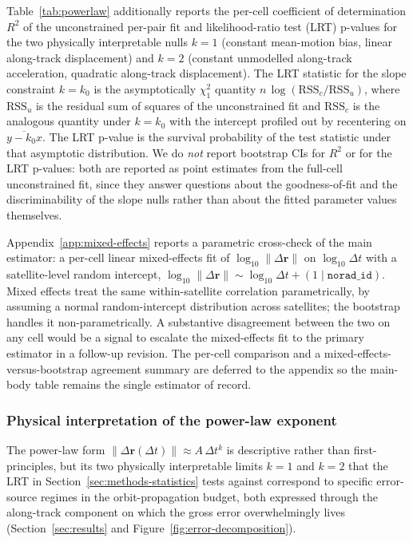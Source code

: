 \documentclass[10pt, letterpaper]{article}
\begin{document}
Table~\ref{tab:powerlaw} additionally reports the per-cell
coefficient of determination $R^{2}$ of the unconstrained
per-pair fit and likelihood-ratio test (LRT) p-values for the two
physically interpretable nulls $k = 1$ (constant mean-motion bias,
linear along-track displacement) and $k = 2$ (constant unmodelled
along-track acceleration, quadratic along-track displacement). The
LRT statistic for the slope constraint $k = k_{0}$ is the
asymptotically $\chi^{2}_{1}$ quantity
$n\,\log(\mathrm{RSS}_{c} / \mathrm{RSS}_{u})$, where
$\mathrm{RSS}_{u}$ is the residual sum of squares of the
unconstrained fit and $\mathrm{RSS}_{c}$ is the analogous quantity
under $k = k_{0}$ with the intercept profiled out by recentering on
$\overline{y - k_{0} x}$. The LRT p-value is the survival probability
of the test statistic under that asymptotic distribution. We do
\emph{not} report bootstrap CIs for $R^{2}$ or for the LRT
p-values: both are reported as point estimates from the full-cell
unconstrained fit, since they answer questions about the
goodness-of-fit and the discriminability of the slope nulls rather
than about the fitted parameter values themselves.

Appendix~\ref{app:mixed-effects} reports a parametric cross-check
of the main estimator: a per-cell linear mixed-effects fit of
$\log_{10}\lVert\Delta\mathbf{r}\rVert$ on $\log_{10}\Delta t$
with a satellite-level random intercept,
$\log_{10}\lVert\Delta\mathbf{r}\rVert \sim
\log_{10}\Delta t + (1 \mid \texttt{norad\_id})$.
Mixed effects treat the same within-satellite correlation
parametrically, by assuming a normal random-intercept distribution
across satellites; the bootstrap handles it non-parametrically. A
substantive disagreement between the two on any cell would be a
signal to escalate the mixed-effects fit to the primary estimator
in a follow-up revision. The per-cell comparison and a
mixed-effects-versus-bootstrap agreement summary are deferred to
the appendix so the main-body table remains the single estimator
of record.

\subsubsection{Physical interpretation of the power-law exponent}
\label{sec:methods-powerlaw-physics}

The power-law form
$\lVert\Delta\mathbf{r}(\Delta t)\rVert \approx A\,\Delta t^{k}$
is descriptive rather than first-principles, but its two
physically interpretable limits $k = 1$ and $k = 2$ that the LRT
in Section~\ref{sec:methods-statistics} tests against correspond
to specific error-source regimes in the orbit-propagation budget,
both expressed through the along-track component on which the
gross error overwhelmingly lives
(Section~\ref{sec:results} and Figure~\ref{fig:error-decomposition}).
\end{document}
